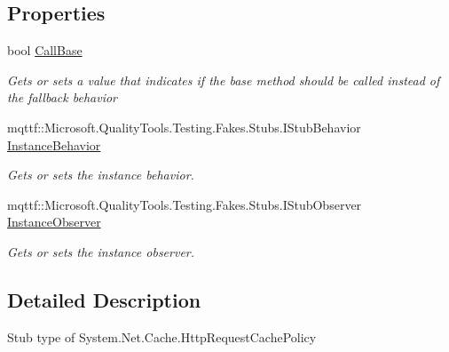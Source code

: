 \subsection*{Properties}
\begin{DoxyCompactItemize}
\item 
bool \hyperlink{class_system_1_1_net_1_1_cache_1_1_fakes_1_1_stub_http_request_cache_policy_aa3db4a29b2626996ae91bdab91d55253}{Call\-Base}
\begin{DoxyCompactList}\small\item\em Gets or sets a value that indicates if the base method should be called instead of the fallback behavior\end{DoxyCompactList}\item 
mqttf\-::\-Microsoft.\-Quality\-Tools.\-Testing.\-Fakes.\-Stubs.\-I\-Stub\-Behavior \hyperlink{class_system_1_1_net_1_1_cache_1_1_fakes_1_1_stub_http_request_cache_policy_aec680d2542fdfec1604d9ff9dc51595a}{Instance\-Behavior}
\begin{DoxyCompactList}\small\item\em Gets or sets the instance behavior.\end{DoxyCompactList}\item 
mqttf\-::\-Microsoft.\-Quality\-Tools.\-Testing.\-Fakes.\-Stubs.\-I\-Stub\-Observer \hyperlink{class_system_1_1_net_1_1_cache_1_1_fakes_1_1_stub_http_request_cache_policy_aab4e6f5f9dfcf7499550f16b0d536e1a}{Instance\-Observer}
\begin{DoxyCompactList}\small\item\em Gets or sets the instance observer.\end{DoxyCompactList}\end{DoxyCompactItemize}


\subsection{Detailed Description}
Stub type of System.\-Net.\-Cache.\-Http\-Request\-Cache\-Policy



